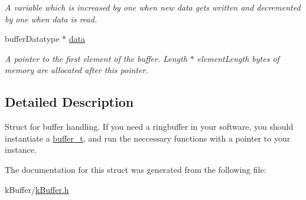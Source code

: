 \begin{DoxyCompactItemize}
\begin{DoxyCompactList}\small\item\em A variable which is increased by one when new data gets written and decremented by one when data is read. \end{DoxyCompactList}\item 
\hypertarget{structbuffer__t_a974e9a505549d9f8ad9e45cb1b562413}{}buffer\+Datatype $\ast$ \hyperlink{structbuffer__t_a974e9a505549d9f8ad9e45cb1b562413}{data}\label{structbuffer__t_a974e9a505549d9f8ad9e45cb1b562413}

\begin{DoxyCompactList}\small\item\em A pointer to the first element of the buffer. Length $\ast$ element\+Length bytes of memory are allocated after this pointer. \end{DoxyCompactList}\end{DoxyCompactItemize}


\subsection{Detailed Description}
Struct for buffer handling. If you need a ringbuffer in your software, you should instantiate a \hyperlink{structbuffer__t}{buffer\+\_\+t}, and run the neccessary functions with a pointer to your instance. 

The documentation for this struct was generated from the following file\+:\begin{DoxyCompactItemize}
\item 
k\+Buffer/\hyperlink{k_buffer_8h}{k\+Buffer.\+h}\end{DoxyCompactItemize}
